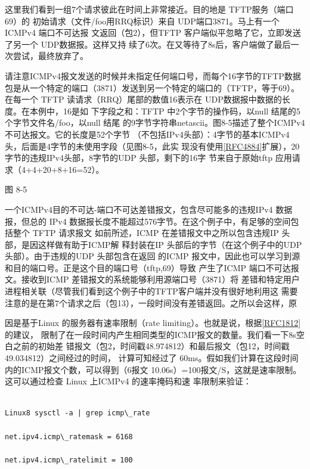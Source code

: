 这里我们看到一组7个请求彼此在时间上非常接近。目的地是 TFTP服务（端口 69）的
初始请求（文件/foo用RRQ标识）来自 UDP端口3871。马上有一个ICMPv4 端口不可达报
文返回（包2），但TFTP 客户端似平忽略了它，立即发送了另一个 UDP数据报。这样又持
续了6次。在又等待了8s后，客户端做了最后一次尝试，最终放弃了。

请注意ICMPv4报文发送的时候并未指定任何端口号，而每个16字节的TFTP数据
包是从一个特定的端口（3871）发送到另一个特定的端口的（TFTP，等于69）。在每一个
TFTP 读请求（RRQ）尾部的数值16表示在 UDP数据报中数据的长度。在本例中，16是如
下字段之和：TFTP 中2个字节的操作码，以null 结尾的5个字节文件名/foo，以null 结尾
的9字节字符串netascii。图8-5描述了整个ICMPv4不可达报文。它的长度是52个字节
（不包括IPv4头部）：4字节的基本ICMPv4 头，后面是4字节的未使用字段（见图8-5，此实
现没有使用\href{https://www.rfc-editor.org/rfc/rfc4884}{[RFC4884]}扩展），20字节的违规IPv4头部，8字节的UDP 头部，剩下的16字
节来自于原始tftp 应用请求（4+4+20+8+16=52）。

图 8-5

一个ICMPv4目的不可达-端口不可达差错报文，包含尽可能多的违规IPv4 数据报，但总的
IPv4 数据报长度不能超过576字节。在这个例子中，有足够的空间包括整个 TFTP 请求报文
如前所述，ICMP 在差错报文中之所以包含违规IP 头部，是因这样做有助于ICMP解
释封装在IP 头部后的字节（在这个例子中的UDP头部）。由于违规的UDP 头部包含在返回
的ICMP 报文中，因此也可以学习到源和目的端口号。正是这个目的端口号（tftp,69）导致
产生了ICMP 端口不可达报文。接收到ICMP 差错报文的系统能够利用源端口号（3871）将
差错和特定用户进程相关联（尽管我们看到这个例子中的TFTP客户端并没有很好地利用这
需要注意的是在第7个请求之后（包13），一段时间没有差错返回。之所以会这样，原

因是基于Linux 的服务器有速率限制（rate limiting）。也就是说，根据\href{https://www.rfc-editor.org/rfc/rfc1812}{[RFC1812]}的建议，
限制了在一段时间内产生相同类型的ICMP报文的数量。我们看一下8s空白之前的初始差
错报文（包2，时间戳48.974812）和最后报文（包12，时间戳49.034812）之间经过的时间，
计算可知经过了 60ms。假如我们计算在这段时间内的ICMP报文个数，可以得到（6报文
10.06s）=100报文/S，这就是速率限制。这可以通过检查 Linux 上ICMPv4 的速率掩码和速
率限制来验证：

\begin{verbatim}
	
Linux8 sysctl -a | grep icmp\_rate

net.ipv4.icmp\_ratemask = 6168

net.ipv4.icmp\_ratelimit = 100
\end{verbatim}


